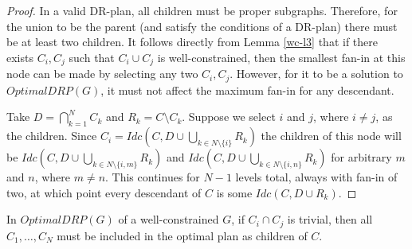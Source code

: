 \begin{proof}
In a valid DR-plan, all children must be proper subgraphs. Therefore, for the union to be the parent (and satisfy the conditions of a DR-plan) there must be at least two children. It follows directly from Lemma \ref{wc-l3} that if there exists $C_i, C_j$ such that $C_i \cup C_j$ is well-constrained, then the smallest fan-in at this node can be made by selecting any two $C_i, C_j$.
However, for it to be a solution to $OptimalDRP(G)$, it must not affect the maximum fan-in for any descendant.

Take $D=\bigcap_{k=1}^N{C_k}$ and $R_k=C\setminus C_k$.
Suppose we select $i$ and $j$, where $i\neq j$, as the children. Since
$C_i=Idc\left(C,D\cup\bigcup_{k\in N\setminus\{i\}}{R_k}\right)$
the children of this node will be
$Idc\left(C,D\cup\bigcup_{k\in N\setminus\{i,m\}}{R_k}\right)$
and
$Idc\left(C,D\cup\bigcup_{k\in N\setminus\{i,n\}}{R_k}\right)$
for arbitrary $m$ and $n$, where $m\neq n$. This continues for $N-1$ levels total, always with fan-in of two, at which point every descendant of $C$ is some $Idc(C,D\cup R_k)$.

\end{proof}




\begin{theorem}\label{uc-t1}

In $OptimalDRP(G)$ of a well-constrained $G$, if $C_i \cap C_j$ is trivial, then all $C_1,\ldots, C_N$ must be included in the optimal plan as children of $C$.
\end{theorem}

